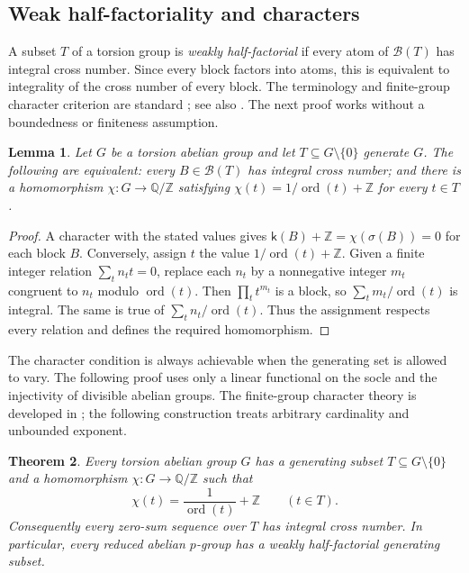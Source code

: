 \documentclass[11pt,reqno]{amsart}
\numberwithin{equation}{section}
\newtheorem{theorem}{Theorem}[section]
\newtheorem{lemma}[theorem]{Lemma}
\theoremstyle{definition}
\theoremstyle{remark}
\newcommand{\Z}{\mathbb Z}
\newcommand{\Q}{\mathbb Q}
\newcommand{\B}{\mathcal B}
\DeclareMathOperator{\ord}{ord}
\begin{document}
\subsection{Weak half-factoriality and characters}

A subset $T$ of a torsion group is \emph{weakly half-factorial} if
every atom of $\B(T)$ has integral cross number. Since every block
factors into atoms, this is equivalent to integrality of the cross
number of every block. The terminology and finite-group character
criterion are standard
\cite[Lemma~4.1]{GaoGeroldinger}; see also
\cite{RadziejewskiSchmid,Schmid2005}. The next proof works without
a boundedness or finiteness assumption.

\begin{lemma}\label{lem:character}
Let $G$ be a torsion abelian group and let
$T\subseteq G\setminus\{0\}$ generate $G$. The following are
equivalent: every $B\in\B(T)$ has integral cross number; and there
is a homomorphism $\chi:G\to\Q/\Z$ satisfying
$\chi(t)=1/\ord(t)+\Z$ for every $t\in T$.
\end{lemma}

\begin{proof}
A character with the stated values gives
$\mathsf k(B)+\Z=\chi(\sigma(B))=0$ for each block $B$.
Conversely, assign $t$ the value $1/\ord(t)+\Z$. Given a finite
integer relation $\sum_t n_t t=0$, replace each $n_t$ by a
nonnegative integer $m_t$ congruent to $n_t$ modulo $\ord(t)$.
Then $\prod_t t^{m_t}$ is a block, so
$\sum_t m_t/\ord(t)$ is integral. The same is true of
$\sum_t n_t/\ord(t)$. Thus the assignment respects every relation
and defines the required homomorphism.
\end{proof}

The character condition is always achievable when the generating
set is allowed to vary. The following proof uses only a linear
functional on the socle and the injectivity of divisible abelian
groups. The finite-group character theory is developed in
\cite{RadziejewskiSchmid}; the following construction treats
arbitrary cardinality and unbounded exponent.

\begin{theorem}\label{thm:weak-existence}
Every torsion abelian group $G$ has a generating subset
$T\subseteq G\setminus\{0\}$ and a homomorphism
$\chi:G\to\Q/\Z$ such that
\begin{equation}\label{eq:weak-character}
 \chi(t)=\frac{1}{\ord(t)}+\Z\qquad(t\in T).
\end{equation}
Consequently every zero-sum sequence over $T$ has integral cross
number. In particular, every reduced abelian $p$-group has a weakly
half-factorial generating subset.
\end{theorem}
\end{document}
